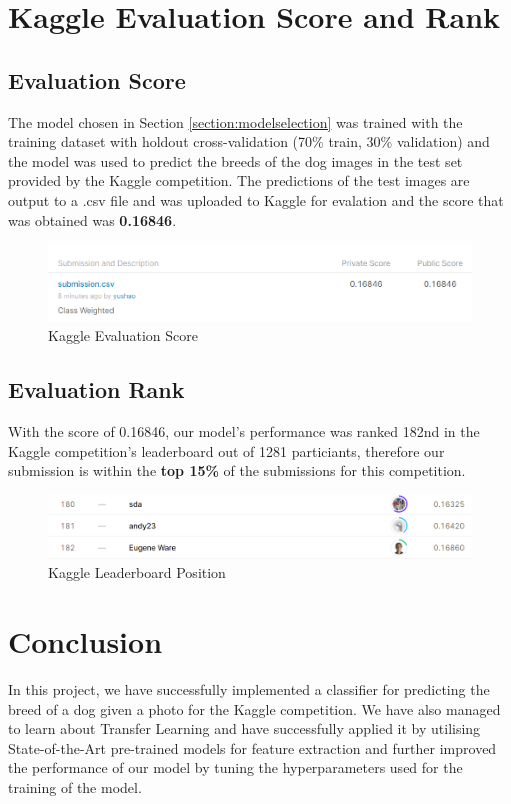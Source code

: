 \documentclass[sigconf,nonacm=true]{acmart}
\begin{document}
\section{Kaggle Evaluation Score and Rank}
\subsection{Evaluation Score}
The model chosen in Section \ref{section:modelselection} was trained with the training dataset with holdout cross-validation
(70\% train, 30\% validation) and the model was used to predict the breeds of the dog images in the test set provided by the 
Kaggle competition. The predictions of the test images are output to a .csv file and was uploaded to Kaggle for evalation and 
the score that was obtained was \textbf{0.16846}.


\begin{figure}[H]
	\centering
	\includegraphics[width=\linewidth]{fig/submissionscore1.PNG}
	\caption{Kaggle Evaluation Score}
	\label{fig:eval1}
\end{figure}

\subsection{Evaluation Rank}
With the score of 0.16846, our model's performance was ranked 182nd in the Kaggle competition's 
leaderboard out of 1281 particiants, therefore our submission is within the \textbf{top 15\%} of the submissions 
for this competition.
\begin{figure}[H]
	\centering
	\includegraphics[width=\linewidth]{fig/lb1.PNG}
	\caption{Kaggle Leaderboard Position}
	\label{fig:lb1}
\end{figure}


\section{Conclusion}
In this project, we have successfully implemented a classifier for predicting the breed of a dog given a photo for the 
Kaggle competition. We have also managed to learn about Transfer Learning and have successfully applied it by utilising 
State-of-the-Art pre-trained models for feature extraction and further improved the performance of our model by 
tuning the hyperparameters used for the training of the model. 
\end{document}
